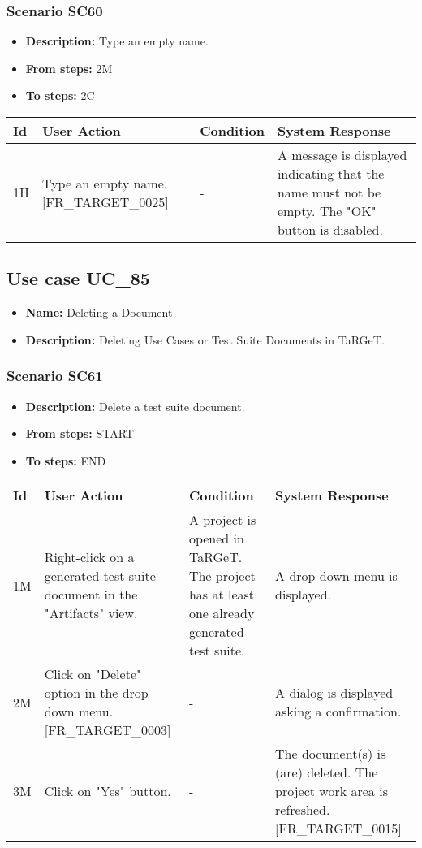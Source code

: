 \documentclass[a4paper,11pt]{article}
\newcommand{\bl}{\\ \hline}
\begin{document}
\subsubsection*{Scenario SC60}
\begin{itemize}
\item {\bf Description:} Type an empty name.
\item {\bf From steps:} 2M
\item {\bf To steps:} 2C
\end{itemize}
\begin{tabular}{|p{0.4in}|p{1.5in}|p{1.5in}|p{1.5in}|}
\hline
Id & User Action & Condition & System Response \bl 
1H & Type an empty name. [FR_TARGET_0025] & - & A message is displayed indicating that the name must not
						be empty. The "OK" button is disabled.\bl
\end{tabular}
\subsection*{Use case UC_85}
\begin{itemize}
\item {\bf Name: }Deleting a Document
\item {\bf Description: }Deleting Use Cases or Test Suite Documents in TaRGeT.
			
\end{itemize}
\subsubsection*{Scenario SC61}
\begin{itemize}
\item {\bf Description:} Delete a test suite document.
\item {\bf From steps:} START
\item {\bf To steps:} END
\end{itemize}
\begin{tabular}{|p{0.4in}|p{1.5in}|p{1.5in}|p{1.5in}|}
\hline
Id & User Action & Condition & System Response \bl 
1M & Right-click on a generated test suite document in the
						"Artifacts" view.  & A project is opened in TaRGeT. The project has at least
						one already generated test suite. & A drop down menu is displayed.\bl
2M & Click on "Delete" option in the drop down menu.
						[FR_TARGET_0003] & - & A dialog is displayed asking a confirmation.\bl
3M & Click on "Yes" button. & - & The document(s) is (are) deleted. The project work area
						is refreshed. [FR_TARGET_0015]\bl
\end{tabular}
\end{document}
